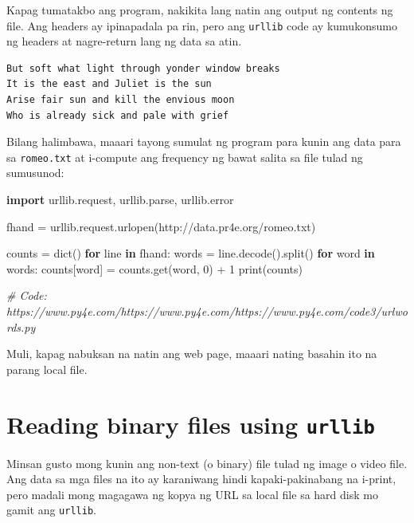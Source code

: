 \documentclass[10pt,]{book}
\newenvironment{Shaded}{}{}
\newcommand{\BuiltInTok}[1]{\textcolor[rgb]{0.00,0.50,0.00}{#1}}
\newcommand{\CommentTok}[1]{\textcolor[rgb]{0.38,0.63,0.69}{\textit{#1}}}
\newcommand{\ControlFlowTok}[1]{\textcolor[rgb]{0.00,0.44,0.13}{\textbf{#1}}}
\newcommand{\DecValTok}[1]{\textcolor[rgb]{0.25,0.63,0.44}{#1}}
\newcommand{\ImportTok}[1]{\textcolor[rgb]{0.00,0.50,0.00}{\textbf{#1}}}
\newcommand{\KeywordTok}[1]{\textcolor[rgb]{0.00,0.44,0.13}{\textbf{#1}}}
\newcommand{\NormalTok}[1]{#1}
\newcommand{\OperatorTok}[1]{\textcolor[rgb]{0.40,0.40,0.40}{#1}}
\newcommand{\StringTok}[1]{\textcolor[rgb]{0.25,0.44,0.63}{#1}}
\begin{document}
Kapag tumatakbo ang program, nakikita lang natin ang output ng contents
ng file. Ang headers ay ipinapadala pa rin, pero ang \texttt{urllib}
code ay kumukonsumo ng headers at nagre-return lang ng data sa atin.

{\small
\begin{verbatim}
But soft what light through yonder window breaks
It is the east and Juliet is the sun
Arise fair sun and kill the envious moon
Who is already sick and pale with grief
\end{verbatim}
}

Bilang halimbawa, maaari tayong sumulat ng program para kunin ang data
para sa \texttt{romeo.txt} at i-compute ang frequency ng bawat salita sa
file tulad ng sumusunod:

\begin{Shaded}
\begin{Highlighting}[]
\ImportTok{import}\NormalTok{ urllib.request, urllib.parse, urllib.error}

\NormalTok{fhand }\OperatorTok{=}\NormalTok{ urllib.request.urlopen(}\StringTok{\textquotesingle{}http://data.pr4e.org/romeo.txt\textquotesingle{}}\NormalTok{)}

\NormalTok{counts }\OperatorTok{=} \BuiltInTok{dict}\NormalTok{()}
\ControlFlowTok{for}\NormalTok{ line }\KeywordTok{in}\NormalTok{ fhand:}
\NormalTok{    words }\OperatorTok{=}\NormalTok{ line.decode().split()}
    \ControlFlowTok{for}\NormalTok{ word }\KeywordTok{in}\NormalTok{ words:}
\NormalTok{        counts[word] }\OperatorTok{=}\NormalTok{ counts.get(word, }\DecValTok{0}\NormalTok{) }\OperatorTok{+} \DecValTok{1}
\BuiltInTok{print}\NormalTok{(counts)}

\CommentTok{\# Code: https://www.py4e.com/https://www.py4e.com/https://www.py4e.com/code3/urlwords.py}
\end{Highlighting}
\end{Shaded}

Muli, kapag nabuksan na natin ang web page, maaari nating basahin ito na
parang local file.

\section{\texorpdfstring{Reading binary files using
\texttt{urllib}}{Reading binary files using urllib}}\label{reading-binary-files-using-urllib}

Minsan gusto mong kunin ang non-text (o binary) file tulad ng image o
video file. Ang data sa mga files na ito ay karaniwang hindi
kapaki-pakinabang na i-print, pero madali mong magagawa ng kopya ng URL
sa local file sa hard disk mo gamit ang \texttt{urllib}.
\end{document}
